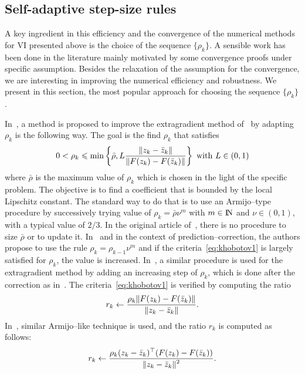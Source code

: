 {\subsection{Self-adaptive step-size rules}
\label{sec:numericalmethods,vi,adaptive}

A key ingredient in this efficiency and the convergence of the numerical methods for VI presented above is the choice of the sequence $\{\rho_k\}$. A sensible work has been done in the literature mainly motivated by some convergence proofs under specific assumption. Besides the relaxation of the assumption for the convergence, we are interesting in improving the numerical efficiency and robustness. We present in this section, the most popular approach for choosing the sequence $\{\rho_k\}$.

In~\citep{Khobotov_CMMP1987}, a method is proposed to improve the extragradient method of~\citet{Korpelevich1976} by adapting $\rho_k$ is the following way.
The goal is the find $\rho_k$ that satisfies
  \begin{equation}
    \label{eq:khobotov1}
    0 < \rho_k \leq \min\left\{\bar\rho,L \Frac{\|z_k-\bar z_k\|}{\|F(z_k)-F(\bar z_k)\|}\right\}\text{ with } L \in (0,1)
  \end{equation}
where $\bar \rho$ is the maximum value of $\rho_k$ which is chosen in the light of the specific problem.
The {objective} is to find a coefficient that is bounded by the local Lipschitz constant. The standard way to do that is to use an Armijo--type procedure by successively trying value of $\rho_k = \bar \rho \nu^m$ with $m\in\mathrm{I\!N}$ and $\nu\in (0,1)$, with a typical value of $2/3$.  In the original article of~\cite{Khobotov_CMMP1987}, there is no procedure to size $\bar \rho$ or to update it. In~\cite{He.Liao_JOTA2002} and in the context of prediction--correction, the authors propose to use the rule $\rho_k =  \rho_{k-1} \nu^m$ and  if the criteria~\eqref{eq:khobotov1} is largely satisfied for $\rho_{k}$, the value is increased.
In~\citep{Han.Lo_CMA2002},  a similar procedure is used for the extragradient method by adding an increasing step of $\rho_k$, which is done after the correction as in~\cite{He.Liao_JOTA2002}. The criteria~\eqref{eq:khobotov1} is  verified by computing the ratio
\begin{equation}
  \label{eq:Khobotov-r}
  r _{k} \leftarrow \Frac{\rho_k \|F(z_k)-F(\bar z_k)\|}{ \|z_k-\bar z_k\| }.
\end{equation}
 In~\citep{Solodov.Tseng1996}, similar Armijo--like technique is used, and the ratio $r_k$ is computed as follows:
\begin{equation}
  \label{eq:SolodovTseng-r}
  r _{k} \leftarrow \Frac{\rho_k(z_k-\bar z_k)^\top(F(z_k)-F(\bar z_k))}{ \|z_k-\bar z_k\|^2 }.
\end{equation}




}

